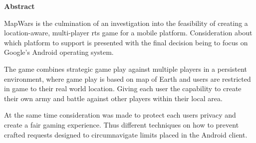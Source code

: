 \thispagestyle{empty}

\begin{center}
    {\LARGE\bf Abstract}
\end{center}

MapWars is the culmination of an investigation into the feasibility of creating a location-aware, multi-player \gls{rts} game for a mobile platform. Consideration about which platform to support is presented with the final decision being to focus on Google's Android operating system.

The game combines strategic game play against multiple players in a persistent environment, where game play is based on map of Earth and users are restricted in game to their real world location. Giving each user the capability to create their own army and battle against other players within their local area.

At the same time consideration was made to protect each users privacy and create a fair gaming experience. Thus different techniques on how to prevent crafted requests designed to circumnavigate limits placed in the Android client.

